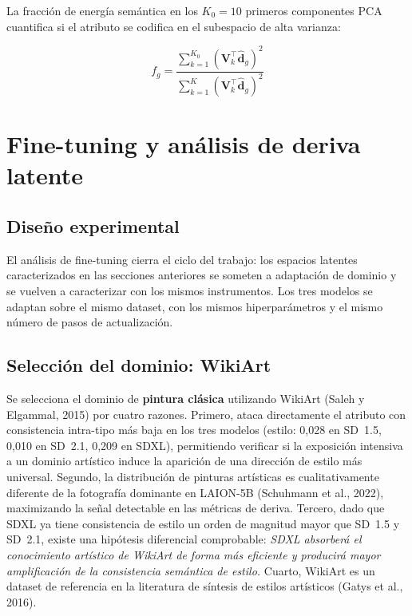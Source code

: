 \documentclass[12pt, a4paper, twoside]{book}
\begin{document}
La fracción de energía semántica en los $K_0 = 10$ primeros componentes PCA cuantifica si el atributo se codifica en el subespacio de alta varianza:

\begin{equation}
f_g = \frac{\sum_{k=1}^{K_0} (\mathbf{V}_k^\top \hat{\mathbf{d}}_g)^2}{\sum_{k=1}^{K} (\mathbf{V}_k^\top \hat{\mathbf{d}}_g)^2}
\end{equation}

\section{Fine-tuning y análisis de deriva latente}
\label{sec:metodos:finetune}

\subsection{Diseño experimental}

El análisis de fine-tuning cierra el ciclo del trabajo: los espacios latentes caracterizados en las secciones anteriores se someten a adaptación de dominio y se vuelven a caracterizar con los mismos instrumentos. Los tres modelos se adaptan sobre el mismo dataset, con los mismos hiperparámetros y el mismo número de pasos de actualización.

\subsection{Selección del dominio: WikiArt}

Se selecciona el dominio de \textbf{pintura clásica} utilizando WikiArt (Saleh y Elgammal, 2015) por cuatro razones. Primero, ataca directamente el atributo con consistencia intra-tipo más baja en los tres modelos (estilo: 0,028 en SD~1.5, 0,010 en SD~2.1, 0,209 en SDXL), permitiendo verificar si la exposición intensiva a un dominio artístico induce la aparición de una dirección de estilo más universal. Segundo, la distribución de pinturas artísticas es cualitativamente diferente de la fotografía dominante en LAION-5B (Schuhmann et al., 2022), maximizando la señal detectable en las métricas de deriva. Tercero, dado que SDXL ya tiene consistencia de estilo un orden de magnitud mayor que SD~1.5 y SD~2.1, existe una hipótesis diferencial comprobable: \textit{SDXL absorberá el conocimiento artístico de WikiArt de forma más eficiente y producirá mayor amplificación de la consistencia semántica de estilo.} Cuarto, WikiArt es un dataset de referencia en la literatura de síntesis de estilos artísticos (Gatys et al., 2016).
\end{document}
